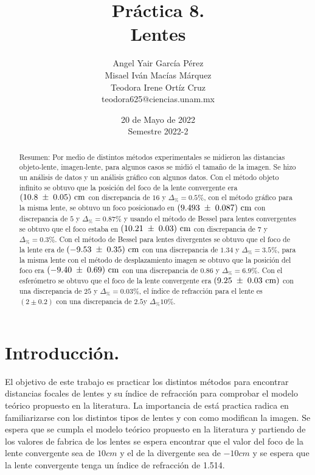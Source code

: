 \documentclass[DIV=calc, paper=a4, fontsize=10pt]{scrartcl}
\title{Práctica 8. \\ %
Lentes} %
\author{Angel Yair García Pérez \\
Misael Iván Macías Márquez\\
Teodora Irene Ortíz Cruz\\
\small{teodora625@ciencias.unam.mx}\\}
\date{20 de Mayo de 2022\\Semestre 2022-2}
\begin{document}
\maketitle
{}
\begin{abstract}
\textcolor{carmine}{Resumen:} Por medio de distintos métodos experimentales se midieron las distancias objeto-lente, imagen-lente, para algunos casos se midió el tamaño de la imagen. Se hizo un análisis de datos y un análisis gráfico con algunos datos. Con el método objeto infinito se obtuvo que la posición del foco de la lente convergente era ${(10.8\hspace{0.1cm}\pm\hspace{0.1cm}{0.05})\text{ cm}}$ con discrepancia de $16$ y $\Delta_{\%}=0.5\%$, con el método gráfico para la misma lente, se obtuvo un foco posicionado en ${(9.493\hspace{0.1cm}\pm\hspace{0.1cm}{0.087})\text{ cm}}$ con discrepancia de $5$ y $\Delta_{\%}=0.87\%$ y usando el método de Bessel para lentes convergentes se obtuvo que el foco estaba en ${(10.21\hspace{0.1cm}\pm\hspace{0.1cm}{0.03})\text{ cm}}$ con discrepancia de $7$  y $\Delta_{\%}=0.3\%$. Con el método de Bessel para lentes divergentes se obtuvo que el foco de la lente era de ${(-9.53\hspace{0.1cm}\pm\hspace{0.1cm}{0.35})\text{ cm}}$ con una discrepancia de $1.34$ y $\Delta_{\%}=3.5\%$, para la misma lente con el método de desplazamiento imagen se obtuvo que la posición del foco era ${(-9.40\hspace{0.1cm}\pm\hspace{0.1cm}{0.69})\text{ cm}}$ con una discrepancia de $0.86$ y  $\Delta_{\%}=6.9\%$. Con el esferómetro se obtuvo que el foco de la lente convergente era $(9.25\hspace{0.1cm}\pm\hspace{0.1cm}0.03\text{ cm})$ con una discrepancia de $25$ y  $\Delta_{\%}=0.03\%$, el índice de refracción para el lente es $(2 \pm 0.2)$ con una discrepancia de $2.5$y $\Delta_{\%}10\%$. 
\end{abstract}
\section*{\textcolor{carmine}{Introducción.}}
El objetivo de este trabajo es practicar los distintos métodos para encontrar distancias focales de lentes y su índice de refracción para comprobar el modelo teórico propuesto en la literatura\cite{Manual}. La importancia de está practica radica en familiarizarse con los distintos tipos de lentes y con como modifican la imagen. Se espera que se cumpla el modelo teórico propuesto en la literatura \cite{book} y partiendo de los valores de fabrica de los lentes se espera encontrar que el valor del foco de la lente convergente sea de $10 cm$ y el de la divergente sea de $-10cm$ y se espera que la lente convergente tenga un índice de refracción de 1.514.
\end{document}
